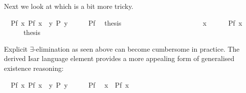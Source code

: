 \begin{isabellebody}
\begin{isamarkuptext}
Next we look at \isa{{\isasymexists}} which is a bit more tricky.%
\end{isamarkuptext}%
\isamarkuptrue%
\isamarkupfalse%
\ \ Pf{\isacharcolon}\ {\isachardoublequoteopen}{\isasymexists}x{\isachardot}\ P{\isacharparenleft}f\ x{\isacharparenright}{\isachardoublequoteclose}\ \ {\isachardoublequoteopen}{\isasymexists}y{\isachardot}\ P\ y{\isachardoublequoteclose}\isanewline
%
\isadelimproof
%
\endisadelimproof
%
\isatagproof
{}\isamarkupfalse%
\ {\isacharminus}\isanewline
\ \ \isamarkupfalse%
\ Pf\ \isamarkupfalse%
\ {\isacharquery}thesis\isanewline
\ \ \isamarkupfalse%
\ \ \ \ \ \ \ \ \ \ \ \ \ \ %
\isanewline
\ \ \ \ \isamarkupfalse%
\ x\isanewline
\ \ \ \ \isamarkupfalse%
\ {\isachardoublequoteopen}P{\isacharparenleft}f\ x{\isacharparenright}{\isachardoublequoteclose}\isanewline
\ \ \ \ \isamarkupfalse%
\ {\isacharquery}thesis\ \isacommand{{\isachardot}{\isachardot}}\isamarkupfalse%
\ \ %
\isanewline
\ \ \isamarkupfalse%
\isanewline
{}\isamarkupfalse%
%
\endisatagproof
{\isafoldproof}%
%
\isadelimproof
%
\endisadelimproof
%
\begin{isamarkuptext}%
\noindent Explicit $\exists$-elimination as seen above can become
cumbersome in practice.  The derived Isar language element
 provides a more appealing form of generalised
existence reasoning:%
\end{isamarkuptext}%
\isamarkuptrue%
\isamarkupfalse%
\ \ Pf{\isacharcolon}\ {\isachardoublequoteopen}{\isasymexists}x{\isachardot}\ P{\isacharparenleft}f\ x{\isacharparenright}{\isachardoublequoteclose}\ \ {\isachardoublequoteopen}{\isasymexists}y{\isachardot}\ P\ y{\isachardoublequoteclose}\isanewline
%
\isadelimproof
%
\endisadelimproof
%
\isatagproof
{}\isamarkupfalse%
\ {\isacharminus}\isanewline
\ \ \isamarkupfalse%
\ Pf\ \isamarkupfalse%
\ x\ \ {\isachardoublequoteopen}P{\isacharparenleft}f\ x{\isacharparenright}{\isachardoublequoteclose}\ \isacommand{{\isachardot}{\isachardot}}\isamarkupfalse%

\end{isabellebody}
